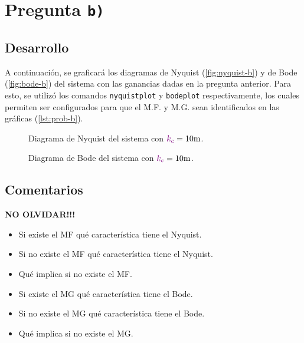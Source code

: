 \section{Pregunta \texttt{b)}}\label{pregunta-b}

\subsection{Desarrollo}

A continuación, se graficará los diagramas de Nyquist (\autoref{fig:nyquist-b})
y de Bode (\autoref{fig:bode-b}) del sistema con las ganancias dadas en la pregunta
anterior. Para esto, se utilizó los comandos \texttt{nyquistplot} y \texttt{bodeplot}
respectivamente, los cuales permiten ser configurados para que el M.F. y M.G. sean
identificados en las gráficas (\autoref{lst:prob-b}).

\begin{figure}[h]
  \centering
  
  \caption{Diagrama de Nyquist del sistema con $\mora{k_{c}} = 10\unit{m}$.}
  \label{fig:nyquist-b}
\end{figure}

\begin{figure}[h]
  \centering
  
  \caption{Diagrama de Bode del sistema con $\mora{k_{c}} = 10\unit{m}$.}
  \label{fig:bode-b}
\end{figure}

\subsection{Comentarios}

\textbf{NO OLVIDAR!!!}

\begin{itemize}
  \item Si existe el MF qué característica tiene el Nyquist.
  \item Si no existe el MF qué característica tiene el Nyquist.
  \item Qué implica si no existe el MF.
  \item Si existe el MG qué característica tiene el Bode.
  \item Si no existe el MG qué característica tiene el Bode.
  \item Qué implica si no existe el MG.
\end{itemize}
